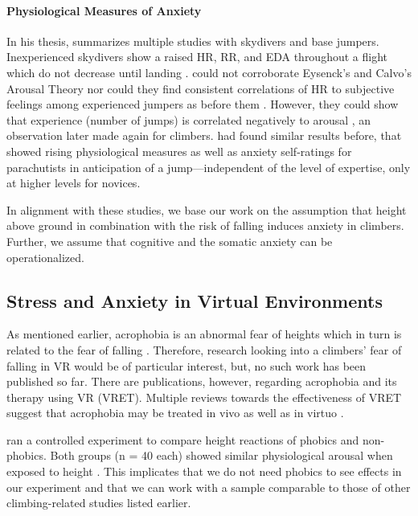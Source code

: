 \paragraph{Physiological Measures of Anxiety} In his thesis, \textcite{Bertle2014} summarizes multiple studies with skydivers and base jumpers. Inexperienced skydivers show a raised \gls{HR}, \gls{RR}, and \gls{EDA} throughout a flight which do not decrease until landing \autocite{Woodman2009,Fenz1967}. \textcite{Breivik1998} could not corroborate Eysenck's and Calvo's Arousal Theory \citeyear{Eysenck1992} nor could they find consistent correlations of \gls{HR} to subjective feelings among experienced jumpers as before them \textcite{Fenz1967}. However, they could show that experience (number of jumps) is correlated negatively to arousal \autocite{Breivik1998}, an observation \textcite{Hardy2007} later made again for climbers. \textcite{Roth1996} had found similar results before, that showed rising physiological measures as well as anxiety self-ratings for parachutists in anticipation of a jump---independent of the level of expertise, only at higher levels for novices.

In alignment with these studies, we base our work on the assumption that height above ground in combination with the risk of falling induces anxiety in climbers. Further, we assume that cognitive and the somatic anxiety can be operationalized.

\subsection{Stress and Anxiety in Virtual Environments}

As mentioned earlier, acrophobia is an abnormal fear of heights which in turn is related to the fear of falling \autocite{Bertle2014}. Therefore, research looking into a climbers' fear of falling in \gls{VR} would be of particular interest, but, no such work has been published so far. There are publications, however, regarding acrophobia and its therapy using \gls{VR} (\gls{VRET}). Multiple reviews towards the effectiveness of \gls{VRET} suggest that acrophobia may be treated in vivo as well as in virtuo \autocite{Meyerbroker2010,Powers2008,Krijn2004}.

\textcite{Diemer2016} ran a controlled experiment to compare height reactions of phobics and non-phobics. Both groups (n = 40 each) showed similar physiological arousal when exposed to height \autocite{Diemer2016}. This implicates that we do not need phobics to see effects in our experiment and that we can work with a sample comparable to those of other climbing-related studies listed earlier.

